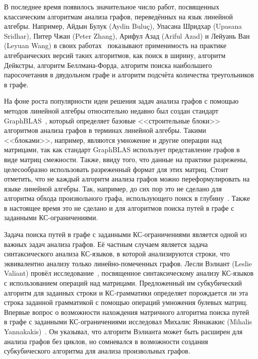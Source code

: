 {\progress}
В последнее время появилось значительное число работ, посвященных классическим алгоритмам анализа графов, переведённых на язык линейной алгебры. Например, Айдын Булук (Aydin Bulu\c{c}), 
Упасана Шридхар (Upasana Sridhar), Питер Чжан (Peter Zhang), Арифул Азад (Ariful Azad) и Лейуань Ван (Leyuan Wang) в своих работах~\cite{bulucc2011parallel,sridhar2019delta,zhang2016gbtl,azad2015parallel,wang2016comparative} показывают применимость на практике алгебраических версий таких алгоритмов, как поиск в ширину, алгоритм Дейкстры, алгоритм Беллмана-Форда, алгоритм поиска наибольшего паросочетания в двудольном графе и алгоритм подсчёта количества треугольников в графе.

На фоне роста популярности идеи решения задач анализа графов с помощью методов линейной алгебры относительно недавно был создан стандарт GraphBLAS~\cite{graphblas}, который определяет базовые <<строительные блоки>> алгоритмов анализа графов в терминах линейной алгебры. Такими <<блоками>>, например, являются умножение и другие операции над матрицами, так как стандарт GraphBLAS использует представление графов в виде матриц смежности. Также, ввиду того, что данные на практике разрежены, целесообразно использовать разреженный формат для этих матриц. Стоит отметить, что не каждый алгоритм анализа графов можно переформулировать на языке линейной алгебры. Так, например, до сих пор это не сделано для алгоритма обхода произвольного графа, использующего поиск в глубину~\cite{spampinato2019linear}. Также в настоящее время это не сделано и для алгоритмов поиска путей в графе с заданными КС-ограничениями.

Задача поиска путей в графе с заданными КС-ограничениями является одной из важных задач анализа графов. Её частным случаем является задача синтаксического анализа КС-языков, в которой анализируются строки, что эквивалентно анализу только линейно-помеченных графов. Лесли Вэлиант (Leslie Valiant) провёл исследование~\cite{valiant1975general}, посвященное синтаксическому анализу КС-языков с использованием операций над матрицами. Предложенный им субкубический алгоритм для заданных строки и КС-грамматики определяет порождается ли эта строка заданной грамматикой с помощью операций умножения булевых матриц. Впервые вопрос о возможности нахождения матричного алгоритма поиска путей в графе с заданными КС-ограничениями исследовал Михалис Яннакакис (Mihalis Yannakakis)~\cite{yannakakis1990graph}. Он указывал, что алгоритм Вэлианта может быть расширен для анализа графов без циклов, но сомневался в возможности создания субкубического алгоритма для анализа произвольных графов. 

